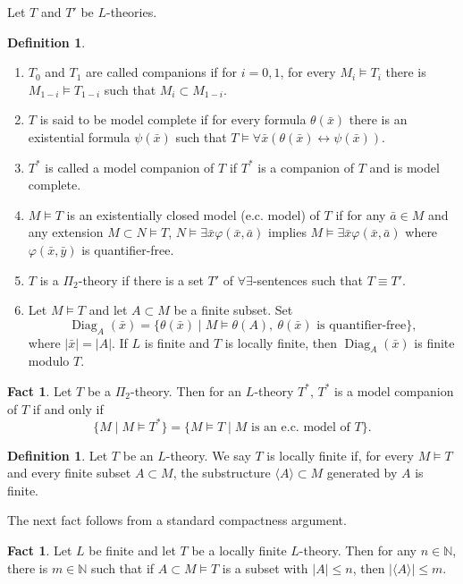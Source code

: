 \documentclass[11pt,reqno]{article}
\theoremstyle{definition}
\newtheorem{definition}[theorem]{Definition}
\newtheorem{fact}[theorem]{Fact}
\theoremstyle{remark}
\DeclareMathOperator{\Diag}{Diag}
\begin{document}
Let $T$ and $T'$ be $L$-theories.
\begin{definition}
    \begin{enumerate}
        \item $T_0$ and $T_1$ are called companions if for $i=0,1$, for every $M_i\models T_i$ there is $M_{1-i}\models T_{1-i}$ such that $M_i\subset M_{1-i}$.
        \item $T$ is said to be model complete if for every formula $\theta(\bar x)$ there is an existential formula $\psi(\bar x)$ such that $T\models \forall \bar x(\theta(\bar x)\leftrightarrow \psi(\bar x))$.
        \item $T^*$ is called a model companion of $T$ if $T^*$ is a companion of $T$ and is model complete.
        \item $M\models T$ is an existentially closed model (e.c. model) of $T$ if for any $\bar a\in M$ and any extension $M\subset N\models T$, $N\models \exists \bar x\varphi(\bar x,\bar a)$ implies $M\models \exists \bar x\varphi(\bar x,\bar a)$ where $\varphi(\bar x,\bar y)$ is quantifier-free.
        \item $T$ is a $\Pi_2$-theory if there is a set $T'$ of $\forall\exists$-sentences such that $T\equiv T'$.
        \item Let $M\models T$ and let $A\subset M$ be a finite subset. Set
        \[
            \Diag_A(\bar x)=\{\theta(\bar x)\mid M\models\theta(A),
            \ \theta(\bar x)\text{ is quantifier-free}\},
        \]
        where $|\bar x|=|A|$. If $L$ is finite and $T$ is locally finite,
        then $\Diag_A(\bar x)$ is finite modulo $T$.
    \end{enumerate}
\end{definition}

\begin{fact}
    Let $T$ be a $\Pi_2$-theory.
    Then for an $L$-theory $T^*$, $T^*$ is a model companion of $T$ if and only if 
    \[
        \{M\mid M\models T^*\}=\{M\models T\mid M\text{ is an e.c. model of $T$}\}.
    \]
\end{fact}

\begin{definition}
    Let $T$ be an $L$-theory.
    We say $T$ is locally finite if, for every $M\models T$ and every finite subset $A\subset M$, the substructure $\langle A\rangle \subset M$ generated by $A$ is finite.
\end{definition}

The next fact follows from a standard compactness argument.
\begin{fact}
    Let $L$ be finite and let $T$ be a locally finite $L$-theory.
    Then for any $n\in\mathbb N$, there is $m\in\mathbb N$ such that if $A\subset M\models T$ is a subset with $|A|\leq n$, then $|\langle A\rangle| \leq m$.
\end{fact}
\end{document}
